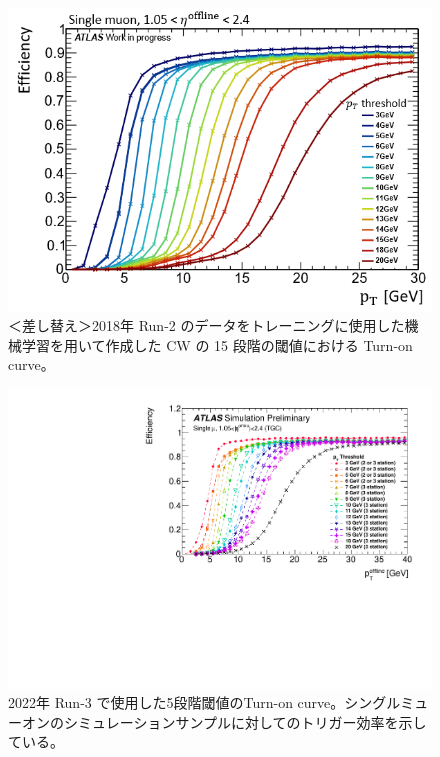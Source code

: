 \begin{figure}[tb]
  \centering
  \includegraphics[clip, width=12cm]{fig/4/v07_15_Eff.png}
  \caption{＜差し替え＞2018年 Run-2 のデータをトレーニングに使用した機械学習を用いて作成した CW の 15 段階の閾値における Turn-on curve。}
  \label{fig:15Eff_CW_Data}
\end{figure}

\begin{figure}[tb]
  \centering
  \includegraphics[clip, width=12cm]{fig/3/PLOT-TRIG-2020-01-fig1.pdf}
  \caption{2022年 Run-3 で使用した5段階閾値のTurn-on curve。シングルミューオンのシミュレーションサンプルに対してのトリガー効率を示している。}
  \label{fig:Run3_15_MC5}
\end{figure}

